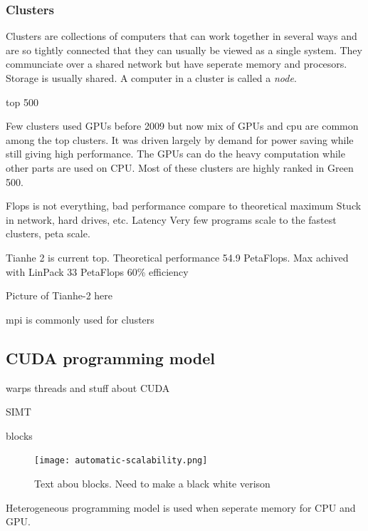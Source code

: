 \documentclass[10pt,a4paper]{article}
\begin{document}
\subsubsection{Clusters}
Clusters are collections of computers that can work together in several ways and are so tightly connected that they can usually be viewed as a single system. They communciate over a shared network but have seperate memory and procesors. Storage is usually shared. A computer in a cluster is called a \emph{node}. \cite{intro_hpc, kirk2012programming}

top 500\cite{TOP500}

Few clusters used GPUs before 2009 but now mix of GPUs and cpu are common among the top clusters. It was driven largely by demand for power saving while still giving high performance. The GPUs can do the heavy computation while other parts are used on CPU. Most of these clusters are highly ranked in Green 500. \cite{kirk2012programming}

Flops is not everything, bad performance compare to theoretical maximum
Stuck in network, hard drives, etc. Latency
Very few programs scale to the fastest clusters, peta scale.

Tianhe 2 is current top. Theoretical performance 54.9 PetaFlops.\cite{TOP500}
Max achived with LinPack 33 PetaFlops
60\% efficiency

Picture of Tianhe-2 here

mpi is commonly used for clusters\cite{kirk2012programming}

\subsection{CUDA programming model}
warps threads and stuff about CUDA\cite{cuda}

SIMT

blocks

\begin{figure}[h]
    \centering
    \texttt{[image: automatic-scalability.png]}
    \caption{Text abou blocks. Need to make a black white verison}
    \label{fig:blocks_scaling}
\end{figure}

Heterogeneous programming model is used when seperate memory for CPU and GPU.
\end{document}
